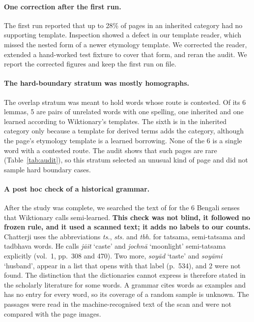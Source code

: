 \documentclass[11pt]{article}
\newcommand{\gl}[1]{`#1'}
\begin{document}
\paragraph{One correction after the first run.} The first run reported that up to 28\% of pages in an inherited category had no supporting template. Inspection showed a defect in our template reader, which missed the nested form of a newer etymology template. We corrected the reader, extended a hand-worked test fixture to cover that form, and reran the audit. We report the corrected figures and keep the first run on file.

\paragraph{The hard-boundary stratum was mostly homographs.} The overlap stratum was meant to hold words whose route is contested. Of its 6 lemmas, 5 are pairs of unrelated words with one spelling, one inherited and one learned according to Wiktionary's templates. The sixth is in the inherited category only because a template for derived terms adds the category, although the page's etymology template is a learned borrowing. None of the 6 is a single word with a contested route. The audit shows that such pages are rare (Table~\ref{tab:audit}), so this stratum selected an unusual kind of page and did not sample hard boundary cases.

\paragraph{A post hoc check of a historical grammar.} After the study was complete, we searched the text of \citet{chatterji1926} for the 6 Bengali senses that Wiktionary calls semi-learned. \textbf{This check was not blind, it followed no frozen rule, and it used a scanned text; it adds no labels to our counts.} Chatterji uses the abbreviations \textit{ts.}, \textit{sts.} and \textit{tbh.} for tatsama, semi-tatsama and tadbhava words. He calls \textit{j\=ait} \gl{caste} and \textit{jochn\=a} \gl{moonlight} semi-tatsama explicitly (vol.~1, pp.~308 and 470). Two more, \textit{soy\=ad} \gl{taste} and \textit{soy\=ami} \gl{husband}, appear in a list that opens with that label (p.~534), and 2 were not found. The distinction that the dictionaries cannot express is therefore stated in the scholarly literature for some words. A grammar cites words as examples and has no entry for every word, so its coverage of a random sample is unknown. The passages were read in the machine-recognised text of the scan and were not compared with the page images.
\end{document}
